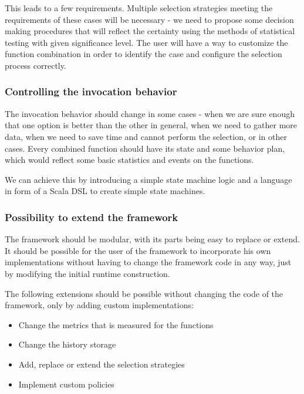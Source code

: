 This leads to a few requirements. Multiple selection strategies meeting the requirements of these cases will be necessary - we need to propose some decision making procedures that will reflect the certainty using the methods of statistical testing with given significance level. The user will have a way to customize the function combination in order to identify the case and configure the selection process correctly.

\subsubsection{Controlling the invocation behavior}

The invocation behavior should change in some cases - when we are sure enough that one option is better than the other in general, when we need to gather more data, when we need to save time and cannot perform the selection, or in other cases. Every combined function should have its state and some behavior plan, which would reflect some basic statistics and events on the functions.

We can achieve this by introducing a simple state machine logic and a language in form of a Scala DSL to create simple state machines.

\subsubsection{Possibility to extend the framework}

The framework should be modular, with its parts being easy to replace or extend. It should be possible for the user of the framework to incorporate his own implementations without having to change the framework code in any way, just by modifying the initial runtime construction.

The following extensions should be possible without changing the code of the framework, only by adding custom implementations:

\begin{itemize}
	\item Change the metrics that is measured for the functions
	\item Change the history storage
	\item Add, replace or extend the selection strategies
	\item Implement custom policies
\end{itemize}